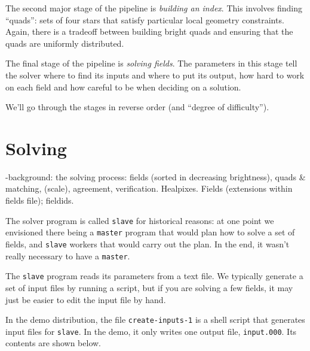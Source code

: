 \documentclass[12pt,letterpaper,titlepage]{article}
\newcommand{\code}[1]{\texttt{#1}}
\begin{document}
The second major stage of the pipeline is \emph{building an index}.  This involves finding
``quads'': sets of four stars that satisfy particular local geometry constraints.  Again, there
is a tradeoff between building bright quads and ensuring that the quads are uniformly distributed.

The final stage of the pipeline is \emph{solving fields}.  The parameters in this stage tell the
solver where to find its inputs and where to put its output, how hard to work on each field
and how careful to be when deciding on a solution.

We'll go through the stages in reverse order (and ``degree of difficulty'').

\section{Solving}

-background: the solving process: fields (sorted in decreasing brightness),
 quads \& matching, (scale), agreement, verification.  Healpixes.  Fields
 (extensions within fields file); fieldids.

The solver program is called \code{slave} for historical reasons: at one point we envisioned
there being a \code{master} program that would plan how to solve a set of fields, and \code{slave}
workers that would carry out the plan.  In the end, it wasn't really necessary to have a \code{master}.

The \code{slave} program reads its parameters from a text file.  We typically generate a set of
input files by running a script, but if you are solving a few fields, it may just be easier to edit
the input file by hand.

In the demo distribution, the file \code{create-inputs-1} is a shell script that generates
input files for \code{slave}.  In the demo, it only writes one output file, \code{input.000}.
Its contents are shown below.
\end{document}
